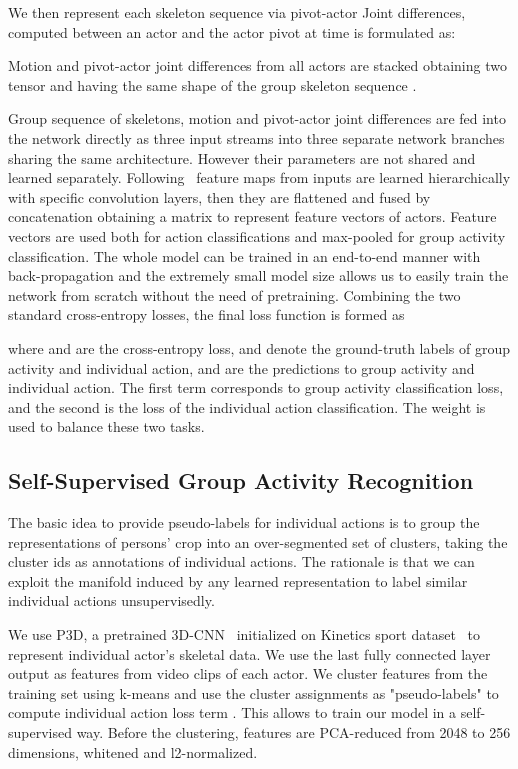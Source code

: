 \documentclass[a4paper,conference]{IEEEtran}
\begin{document}
We then represent each skeleton sequence via pivot-actor Joint differences, computed between an actor  and the actor pivot  at time  is formulated as: 

Motion  and pivot-actor joint differences  from all actors are stacked obtaining two tensor  and  having the same shape of the group skeleton sequence .



Group sequence of skeletons, motion and pivot-actor joint differences are fed into the network directly as three input streams into three separate network branches sharing the same architecture. However their parameters are not shared and learned separately. Following~\cite{hcn} feature maps from inputs are learned hierarchically with specific convolution layers, then they are flattened and fused by concatenation obtaining a  matrix to represent feature vectors of actors. 
Feature vectors are used both for action classifications and max-pooled for group activity classification. The whole model can be trained in an end-to-end manner with back-propagation and the extremely small model size allows us to easily train the network from scratch without the need of pretraining. Combining the two standard cross-entropy losses, the final loss function is formed as 

where  and  are the cross-entropy loss,  and  denote the ground-truth labels of group activity and individual action,  and  are the predictions to group activity and individual action. The first term corresponds to group activity classification loss, and the second is the loss of the individual action classification. The weight  is used to balance these two tasks.

\subsection{Self-Supervised Group Activity Recognition}
The basic idea to provide pseudo-labels for individual actions is to group the representations of persons' crop  into an over-segmented set of clusters, taking the cluster ids as annotations of individual actions. The rationale is that we can exploit the manifold induced by any learned representation to label similar individual actions unsupervisedly.

We use P3D, a pretrained 3D-CNN~\cite{Qiu_2017_ICCV} initialized  on Kinetics sport dataset~\cite{kay2017kinetics} to represent individual actor's skeletal data. We use the last fully connected layer output as features from video clips of each actor. We cluster features from the training set using k-means and use the cluster assignments as "pseudo-labels"  to compute individual action loss term . This allows to train our model in a self-supervised way. Before the clustering, features are PCA-reduced from 2048 to 256 dimensions, whitened and l2-normalized.  
\end{document}
